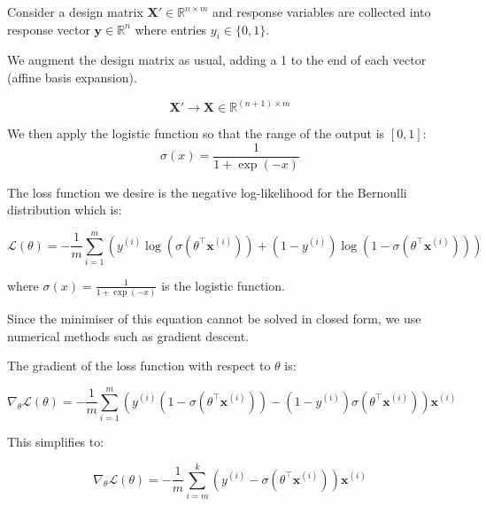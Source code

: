 Consider a design matrix $\bm{X}' \in \mathbb{R}^{n \times m}$ and response variables are collected into response vector $\bm{y} \in \mathbb{R}^n$ where entries $y_i \in \{0,1\}$. \bigskip

We augment the design matrix as usual, adding a 1 to the end of each vector (affine basis expansion).

\begin{equation}
    \bm{X}' \rightarrow \bm{X} \in \mathbb{R}^{(n+1) \times m}
\end{equation}

We then apply the logistic function so that the range of the output is $[0,1]$:
\begin{equation}
    \sigma(x) = \frac{1}{1 + \exp(-x)}
\end{equation}

The loss function we desire is the negative log-likelihood for the Bernoulli distribution which is:

\[
    \mathcal{L}(\theta) = -\frac{1}{m} \sum_{i=1}^{m} \left( y^{(i)} \log(\sigma(\theta^\top \bm{x}^{(i)})) + (1 - y^{(i)}) \log(1 - \sigma(\theta^\top \bm{x}^{(i)})) \right)
\]

where \(\sigma(x) = \frac{1}{1 + \exp(-x)}\) is the logistic function. \bigskip

Since the minimiser of this equation cannot be solved in closed form, we use numerical methods such as gradient descent.

The gradient of the loss function with respect to \(\theta\) is:

\[
    \nabla_\theta \mathcal{L}(\theta) = -\frac{1}{m} \sum_{i=1}^{m} \left( y^{(i)} (1 - \sigma(\theta^\top \bm{x}^{(i)})) - (1 - y^{(i)}) \sigma(\theta^\top \bm{x}^{(i)}) \right) \bm{x}^{(i)}
\]

This simplifies to:

\[
    \nabla_\theta \mathcal{L}(\theta) = -\frac{1}{m} \sum_{i=m}^{k} \left( y^{(i)} - \sigma(\theta^\top \bm{x}^{(i)}) \right) \bm{x}^{(i)}
\]


